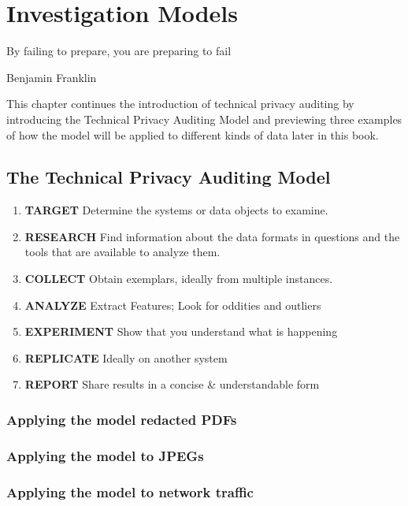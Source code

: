 \chapter{Investigation Models \TODO}
\setlength{\epigraphwidth}{3in}
\epigraph{By failing to prepare, you are preparing to fail}{Benjamin Franklin}

This chapter continues the introduction of technical privacy
auditing by introducing the Technical Privacy Auditing Model and
previewing three examples of how the model will be applied to
different kinds of data later in this book.

\section{The Technical Privacy Auditing Model \TODO}

\begin{enumerate}
\item \textbf{TARGET} Determine the systems or data objects to examine.
\item \textbf{RESEARCH} Find information about the data formats in
  questions and the tools that are available to analyze them. 
\item \textbf{COLLECT} Obtain exemplars, ideally from multiple instances.
\item \textbf{ANALYZE} Extract Features; Look for oddities and outliers
\item \textbf{EXPERIMENT} Show that you understand what is happening
\item \textbf{REPLICATE} Ideally on another system
\item \textbf{REPORT} Share results in a concise \& understandable form
\end{enumerate}


\subsection{Applying the model redacted PDFs \TODO}

\subsection{Applying the model to JPEGs \TODO}

\subsection{Applying the model to network traffic \TODO}

